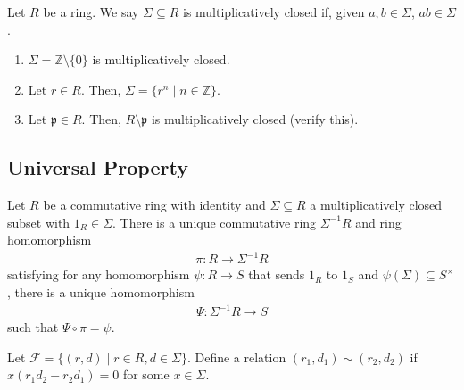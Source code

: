\documentclass[8pt]{extarticle}
\newcommand{\Z}{\mathbb{Z}}
\begin{document}
  Let $R$ be a ring. We say $\Sigma \subseteq R$ is multiplicatively closed if, given $a,b\in \Sigma$, $ab \in \Sigma$.
  \begin{enumerate}[(1)]
    \item $\Sigma = \Z\setminus\{0\}$ is multiplicatively closed.
    \item Let $r\in R$. Then, $\Sigma = \{r^n\mid n\in\Z\}$.
    \item Let $\mathfrak{p}\in R$. Then, $R\setminus \mathfrak{p}$ is multiplicatively closed (verify this).
  \end{enumerate}
  \subsection{Universal Property}%
  Let $R$ be a commutative ring with identity and $\Sigma\subseteq R$ a multiplicatively closed subset with $1_R\in \Sigma$. There is a unique commutative ring $\Sigma^{-1}R$ and ring homomorphism
  \begin{align*}
   \pi: R\rightarrow \Sigma^{-1}R
  \end{align*}
  satisfying for any homomorphism $\psi: R\rightarrow S$ that sends $1_R$ to $1_S$ and $\psi(\Sigma) \subseteq S^{\times}$, there is a unique homomorphism
  \begin{align*}
   \Psi: \Sigma^{-1}R \rightarrow S
  \end{align*}
  such that $\Psi \circ \pi = \psi$.
  \begin{center}
  \end{center}
  Let $\mathcal{F} = \{(r,d)\mid r\in R,d\in \Sigma\}$. Define a relation $(r_1,d_1)\sim (r_2,d_2)$ if $x(r_1d_2 - r_2d_1)= 0$ for some $x\in \Sigma$.\\
\end{document}
